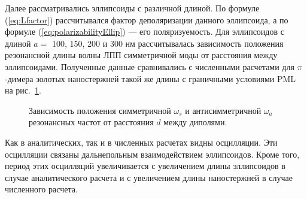 Далее рассматривались эллипсоиды с различной длиной. По формуле (\ref{eq:Lfactor}) рассчитывался фактор деполяризации данного эллипсоида, а по формуле (\ref{eq:polarizabilityEllip}) --- его поляризуемость. Для эллипсоидов с длиной $ a = $ 100, 150, 200 и 300 нм рассчитывалась зависимость положения резонансной длины волны ЛПП симметричной моды от расстояния между эллипсоидами. Полученные данные сравнивались с численными расчетами для $ \pi $-димера золотых наностержней такой же длины с граничными условиями PML на рис.~\ref{img:res1_analytic_FDTD}.
\begin{figure}[t]
\caption{Зависимость положения симметричной $ \omega_s $ и антисимметричной $ \omega_a $ резонансных частот от расстояния $ d $ между диполями.}
\label{img:res1_analytic_FDTD}
\end{figure}
Как в аналитических, так и в численных расчетах видны осцилляции. Эти осцилляции связаны дальнепольным взаимодействием эллипсоидов. Кроме того, период этих осцилляций увеличивается с увеличением длины эллипсоидов в случае аналитического расчета и с увеличением длины наностержней в случае численного расчета. 
